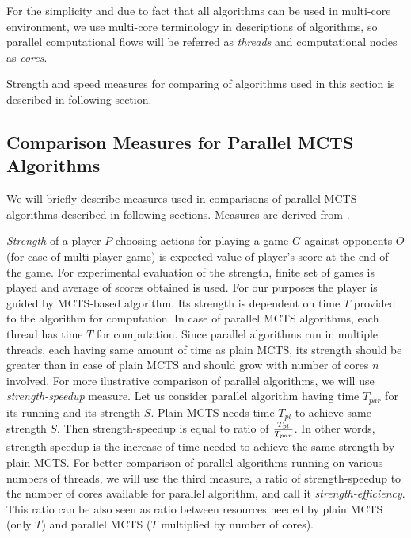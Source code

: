 For the simplicity and due to fact that all algorithms can be used in multi-core environment, we 
use multi-core terminology in descriptions of algorithms, so parallel
computational flows will be referred as \emph{threads} and computational nodes as \emph{cores}.

Strength and speed measures for comparing of algorithms used in this section is described in
following section.

\subsection{Comparison Measures for Parallel MCTS Algorithms}
\label{sec_measures_parallel}

We will briefly describe measures used in comparisons of parallel MCTS algorithms described in
following sections. Measures are derived from \cite{Chaslot2008}.

\emph{Strength} of a player $P$ choosing actions for playing a game $G$ against
opponents $O$ (for case of multi-player game) 
is expected value of player's score at the end of the game. For experimental evaluation of the
strength, finite set of games is played and average of scores obtained is used. For our
purposes the player is guided by MCTS-based algorithm. Its strength is dependent on time $T$
provided to the algorithm for computation. In case of parallel MCTS algorithms, each thread has
time $T$ for computation. Since parallel algorithms run in multiple threads, each having same
amount of time as plain MCTS, its strength should be greater than in case of plain MCTS and should 
grow with number of cores $n$ involved. For more ilustrative comparison of parallel algorithms,
we will use \emph{strength-speedup} measure. Let us consider parallel algorithm having time
$T_{par}$
for its running and its strength $S$. Plain MCTS needs time $T_{pl}$ to achieve same strength
$S$. Then strength-speedup is equal to ratio of $T_{pl} \over T_{par}$. In other words,
strength-speedup is the increase of time needed to achieve the same strength by plain MCTS.
For better comparison of parallel algorithms running on various numbers of threads, we will use 
the third measure, a ratio of strength-speedup to the number of cores available for parallel
algorithm, and call it \emph{strength-efficiency}. This ratio can be also seen as ratio between
resources needed by plain MCTS (only $T$) and parallel MCTS ($T$ multiplied by number of
cores).

